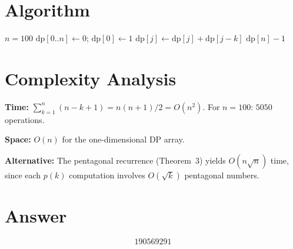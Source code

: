 \documentclass[11pt]{article}
\begin{document}
\section{Algorithm}

\begin{algorithm}[H]
\caption{Compute $p(n) - 1$}
\begin{algorithmic}[1]
\REQUIRE $n = 100$
\STATE $\mathrm{dp}[0..n] \gets 0$; $\mathrm{dp}[0] \gets 1$
        \STATE $\mathrm{dp}[j] \gets \mathrm{dp}[j] + \mathrm{dp}[j - k]$
    \ENDFOR
\ENDFOR
\RETURN $\mathrm{dp}[n] - 1$
\end{algorithmic}
\end{algorithm}

\section{Complexity Analysis}

\textbf{Time:} $\sum_{k=1}^{n}(n - k + 1) = n(n+1)/2 = O(n^2)$. For $n = 100$: $5050$ operations.

\textbf{Space:} $O(n)$ for the one-dimensional DP array.

\textbf{Alternative:} The pentagonal recurrence (Theorem~3) yields $O(n\sqrt{n})$ time, since each $p(k)$ computation involves $O(\sqrt{k})$ pentagonal numbers.

\section{Answer}

\[
\boxed{190569291}
\]
\end{document}
